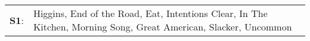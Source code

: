 \begin{supertabular}{p{0.03\textwidth}p{0.92\textwidth}}
 \textbf{S1}:  &  Higgins\textsuperscript{}, \enspace End of the Road\textsuperscript{}, \enspace Eat\textsuperscript{}, \enspace Intentions Clear\textsuperscript{}, \enspace In The Kitchen\textsuperscript{}, \enspace Morning Song\textsuperscript{}, \enspace Great American\textsuperscript{}, \enspace Slacker\textsuperscript{}, \enspace Uncommon\textsuperscript{}  \enspace  \\
\end{supertabular}
